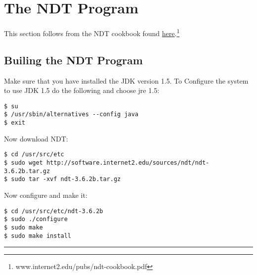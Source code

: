 \section{The NDT Program}
This section follows from the NDT cookbook found \href{www.internet2.edu/pubs/ndt-cookbook.pdf‎}{here}.\footnote{www.internet2.edu/pubs/ndt-cookbook.pdf‎}
\subsection{Builing the NDT Program}
Make sure that you have installed the JDK version 1.5. To Configure the system to use JDK 1.5 do the following and choose jre 1.5: 
\begin{snugshade}\begin{lstlisting}
$ su
$ /usr/sbin/alternatives --config java
$ exit
\end{lstlisting}\end{snugshade}\noindent
Now download NDT:
\begin{snugshade}\begin{lstlisting}
$ cd /usr/src/etc
$ sudo wget http://software.internet2.edu/sources/ndt/ndt-3.6.2b.tar.gz
$ sudo tar -xvf ndt-3.6.2b.tar.gz
\end{lstlisting}\end{snugshade}\noindent
Now configure and make it:
\begin{snugshade}\begin{lstlisting}
$ cd /usr/src/etc/ndt-3.6.2b
$ sudo ./configure
$ sudo make
$ sudo make install
\end{lstlisting}\end{snugshade}\noindent

\hrule

